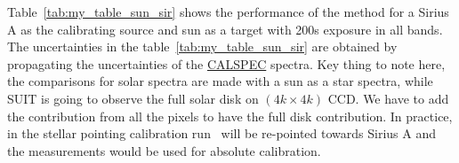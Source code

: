 Table~\ref{tab:my_table_sun_sir} shows the performance of the method for a Sirius A as the calibrating source and sun as a target with 200s exposure in all bands. The uncertainties in the table~\ref{tab:my_table_sun_sir} are obtained by propagating the uncertainties of the \href{https://www.stsci.edu/hst/instrumentation/reference-data-for-calibration-and-tools/astronomical-catalogs/calspec}{CALSPEC} spectra. Key thing to note here, the comparisons for solar spectra are made with a sun as a star spectra, while SUIT is going to observe the full solar disk on $(4k \times 4k)$ CCD. We have to add the contribution from all the pixels to have the full disk contribution. In practice, in the stellar pointing calibration run \suit~will be re-pointed towards Sirius A and the measurements would be used for absolute calibration.


